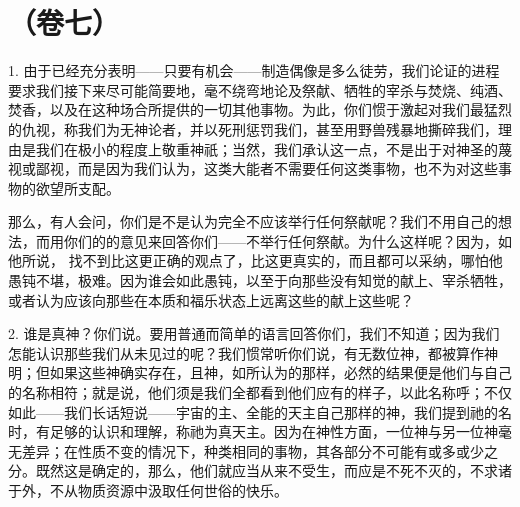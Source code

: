 \section{（卷七）}

1. 由于已经充分表明——只要有机会——制造偶像是多么徒劳，我们论证的进程要求我们接下来尽可能简要地，毫不绕弯地论及祭献、牺牲的宰杀与焚烧、纯酒、焚香，以及在这种场合所提供的一切其他事物。为此，你们惯于激起对我们最猛烈的仇视，称我们为无神论者，并以死刑惩罚我们，甚至用野兽残暴地撕碎我们，理由是我们在极小的程度上敬重神祇；当然，我们承认这一点，不是出于对神圣的蔑视或鄙视，而是因为我们认为，这类大能者不需要任何这类事物，也不为对这些事物的欲望所支配。\par

那么，有人会问，你们是不是认为完全不应该举行任何祭献呢？我们不用自己的想法，而用你们的的意见来回答你们——不举行任何祭献。为什么这样呢？因为，如他所说， 找不到比这更正确的观点了，比这更真实的，而且都可以采纳，哪怕他愚钝不堪，极难。因为谁会如此愚钝，以至于向那些没有知觉的献上、宰杀牺牲，或者认为应该向那些在本质和福乐状态上远离这些的献上这些呢？\par

2. 谁是真神？你们说。要用普通而简单的语言回答你们，我们不知道；因为我们怎能认识那些我们从未见过的呢？我们惯常听你们说，有无数位神，都被算作神明；但如果这些神确实存在，且神，如所认为的那样，必然的结果便是他们与自己的名称相符；就是说，他们须是我们全都看到他们应有的样子，以此名称呼；不仅如此——我们长话短说——宇宙的主、全能的天主自己那样的神，我们提到祂的名时，有足够的认识和理解，称祂为真天主。因为在神性方面，一位神与另一位神毫无差异；在性质不变的情况下，种类相同的事物，其各部分不可能有或多或少之分。既然这是确定的，那么，他们就应当从来不受生，而应是不死不灭的，不求诸于外，不从物质资源中汲取任何世俗的快乐。\par

